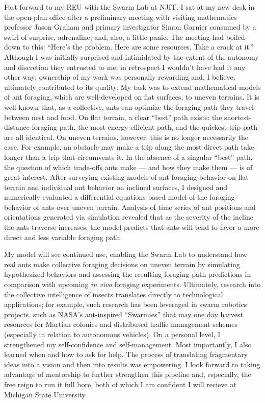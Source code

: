 Fast forward to my REU with the Swarm Lab at NJIT.
I sat at my new desk in the open-plan office after a preliminary meeting with visiting mathematics professor Jason Graham and primary investigator Simon Garnier consumed by a swirl of surprise, adrenaline, and, also, a little panic.
The meeting had boiled down to this:
``Here's the problem.
Here are some resources.
Take a crack at it.''
Although I was initially surprised and intimidated by the extent of the autonomy and discretion they entrusted to me, in retrospect I wouldn't have had it any other way;
ownership of my work was personally rewarding and, I believe, ultimately contributed to its quality.
My task was to extend mathematical models of ant foraging, which are well-developed on flat surfaces, to uneven terrains.
It is well known that, as a collective, ants can optimize the foraging path they travel between nest and food.
On flat terrain, a clear ``best'' path exists: the shortest-distance foraging path, the most energy-efficient path, and the quickest-trip path are all identical.
On uneven terrains, however, this is no longer necessarily the case.
For example, an obstacle may make a trip along the most direct path take longer than a trip that circumvents it.
In the absence of a singular ``best'' path, the question of which trade-offs ants make --- and how they make them --- is of great interest.
After surveying existing models of ant foraging behavior on flat terrain and individual ant behavior on inclined surfaces, I designed and numerically evaluated a differential equations-based model of the foraging behavior of ants over uneven terrain.
Analysis of time series of ant positions and orientations generated via simulation revealed that as the severity of the incline the ants traverse increases, the model predicts that ants will tend to favor a more direct and less variable foraging path.

My model will see continued use, enabling the Swarm Lab to understand how real ants make collective foraging decisions on uneven terrain by simulating hypothesized behaviors and assessing the resulting foraging path predictions in comparison with upcoming \textit{in vivo} foraging experiments.
Ultimately, research into the collective intelligence of insects translates directly to technological applications;
for example, such research has been leveraged in swarm robotics projects, such as NASA's ant-inspired ``Swarmies'' that may one day harvest resources for Martian colonies and distributed traffic management schemes (especially in relation to autonomous vehicles).
On a personal level, I strengthened my self-confidence and self-management.
Most importantly, I also learned when and how to ask for help.
The process of translating fragmentary ideas into a vision and then into results was empowering.
I look forward to taking advantage of mentorship to further strengthen this pipeline and, especially, the free reign to run it full bore, both of which I am confident I will recieve at Michigan State University.
